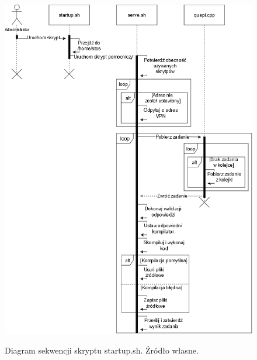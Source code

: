 \begin{figure}[!h]
	\begin{center}
		\resizebox{1.0\textwidth}{!} {
			\includegraphics{img/2/startup.png}
		}
		\caption[Diagram sekwencji skryptu startup.sh]{Diagram sekwencji skryptu startup.sh. Źródło własne.}
		\label{startup}
	\end{center}
\end{figure}

